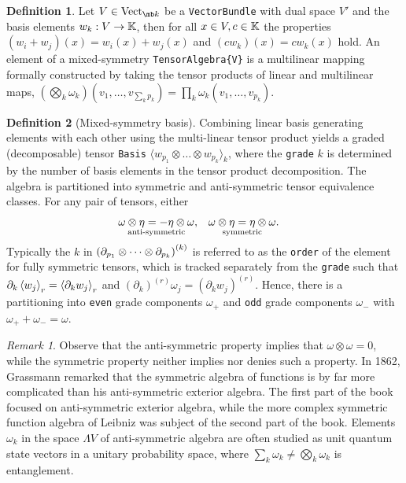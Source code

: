 \documentclass[]{article}
\theoremstyle{definition}
\newtheorem{definition}{Definition}
\theoremstyle{remark}
\newtheorem*{remark}{Remark}
\begin{document}
\begin{definition}
	Let $V\in\text{Vect}_{\mb k}$ be a \verb`VectorBundle` with dual space $V'$ and the basis elements $w_k:V\rightarrow\mathbb{K}$, then for all $x\in V,c\in\mathbb{K}$ the properties $(w_i+w_j)(x) = w_i(x)+w_j(x)$ and $(cw_k)(x) = cw_k(x)$ hold.
	An element of a mixed-symmetry \verb`TensorAlgebra{V}` is a multilinear mapping formally constructed by taking the tensor products of linear and multilinear maps,
	$(\bigotimes_k \omega_k)(v_1,\dots,v_{\sum_k p_k}) = \prod_k \omega_k(v_1,\dots,v_{p_k})$.
\end{definition}
\begin{definition}[Mixed-symmetry basis]
	Combining linear basis generating elements with each other using the multi-linear tensor product yields a graded (decomposable) tensor \verb`Basis` $\langle w_{p_1}\otimes\dots\otimes w_{p_k}\rangle_k$, where the \verb`grade` $k$ is determined by the number of basis elements in the tensor product decomposition.
	The algebra is partitioned into symmetric and anti-symmetric tensor equivalence classes.
	For any pair of tensors, either
	\begin{align*}
		&\underset{\text{anti-symmetric}}{\omega\otimes\eta = -\eta\otimes\omega}, & &\underset{\text{symmetric}}{\omega\otimes\eta = \eta\otimes\omega}.
	\end{align*}
	Typically the $k$ in $\left(\partial_{p_1}\otimes\cdots\otimes\partial_{p_k}\right)^{(k)}$ is referred to as the \verb`order` of the element for fully symmetric tensors, which is tracked separately from the \verb`grade` such that $\partial_k\left\langle w_j \right\rangle_r = \left\langle \partial_kw_j \right\rangle_r$ and $(\partial_k)^{(r)}\omega_j = (\partial_kw_j)^{(r)}$.
	Hence, there is a partitioning into \verb`even` grade components $\omega_+$ and \verb`odd` grade components $\omega_-$ with $\omega_++\omega_-=\omega$.
\end{definition}
\begin{remark}
	Observe that the anti-symmetric property implies that $\omega\otimes\omega=0$, while the symmetric property neither implies nor denies such a property.
	In 1862, Grassmann remarked \cite{grassmann-2} that the symmetric algebra of functions is by far more complicated than his anti-symmetric exterior algebra.
	The first part of the book focused on anti-symmetric exterior algebra, while the more complex symmetric function algebra of Leibniz was subject of the second part of the book.
	Elements $\omega_k$ in the space $\Lambda V$ of anti-symmetric algebra are often studied as unit quantum state vectors in a unitary probability space, where $\sum_k\omega_k\neq\bigotimes_k\omega_k$ is entanglement.
\end{remark}
\end{document}
